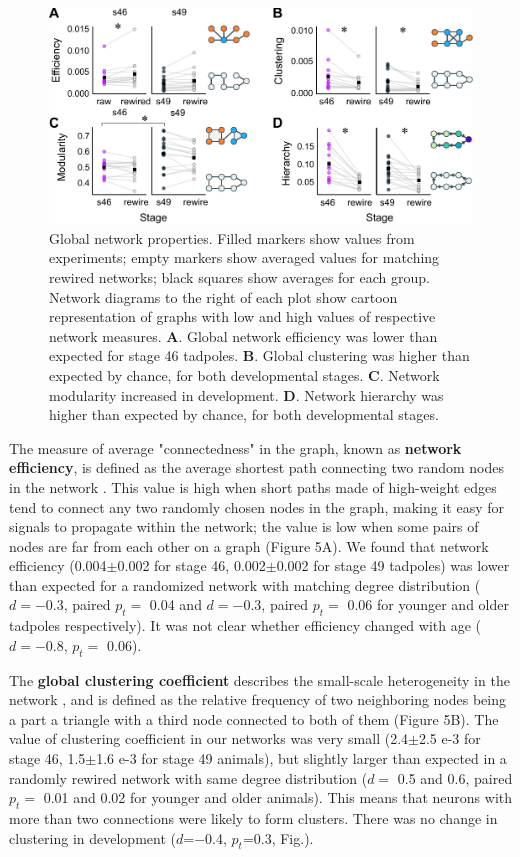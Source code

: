 \documentclass{article}
\begin{document}
\begin{figure}[t!]
\includegraphics[width=\linewidth]{fig5.pdf}
\caption{
Global network properties. Filled markers show values from experiments; empty markers show averaged values for matching rewired networks; black squares show averages for each group. Network diagrams to the right of each plot show cartoon representation of graphs with low and high values of respective network measures. \textbf{A}. Global network efficiency was lower than expected for stage 46 tadpoles. \textbf{B}. Global clustering was higher than expected by chance, for both developmental stages. \textbf{C}. Network modularity increased in development.  \textbf{D}. Network hierarchy was higher than expected by chance, for both developmental stages. }
\end{figure}

The measure of average "connectedness" in the graph, known as \textbf{network efficiency}, is defined as the average shortest path connecting two random nodes in the network \citep{latora2001efficiency, rubinov2010toolbox}. This value is high when short paths made of high-weight edges tend to connect any two randomly chosen nodes in the graph, making it easy for signals to propagate within the network; the value is low when some pairs of nodes are far from each other on a graph (Figure 5A). We found that network efficiency (0.004$\pm$0.002 for stage 46, 0.002$\pm$0.002 for stage 49 tadpoles) was lower than expected for a randomized network with matching degree distribution ($d=-$0.3, paired $p_t=$ 0.04 and $d=-$0.3, paired $p_t=$ 0.06 for younger and older tadpoles respectively). It was not clear whether efficiency changed with age ($d=-$0.8, $p_t=$ 0.06).

The \textbf{global clustering coefficient} describes the small-scale heterogeneity in the network \citep{fagiolo2007}, and is defined as the relative frequency of two neighboring nodes being a part a triangle with a third node connected to both of them (Figure 5B). The value of clustering coefficient in our networks was very small (2.4$\pm$2.5 e-3 for stage 46, 1.5$\pm$1.6 e-3 for stage 49 animals), but slightly larger than expected in a randomly rewired network with same degree distribution ($d=$ 0.5 and 0.6, paired $p_t=$ 0.01 and 0.02 for younger and older animals). This means that neurons with more than two connections were likely to form clusters. There was no change in clustering in development ($d$=$-$0.4, $p_t$=0.3, Fig.).
\end{document}
